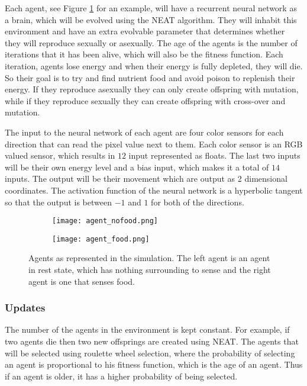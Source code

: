 Each agent, see Figure \ref{fig:agent} for an example, will have a recurrent neural network as a brain, which will be evolved using the NEAT algorithm.
They will inhabit this environment and have an extra evolvable parameter that determines whether they will reproduce sexually or asexually. 
The age of the agents is the number of iterations that it has been alive, which will also be the fitness function.
Each iteration, agents lose energy and when their energy is fully depleted, they will die.
So their goal is to try and find nutrient food and avoid poison to replenish their energy.
If they reproduce asexually they can only create offspring with mutation, while if they reproduce sexually they can create offspring with cross-over and mutation. 

The input to the neural network of each agent are four color sensors for each direction that can read the pixel value next to them.
Each color sensor is an RGB valued sensor, which results in $12$ input represented as floats.
The last two inputs will be their own energy level and a bias input, which makes it a total of $14$ inputs.
The output will be their movement which are output as 2 dimensional coordinates.
The activation function of the neural network is a hyperbolic tangent so that the output is between $-1$ and $1$ for both of the directions. 

\begin{figure}[H]
\begin{subfigure}[b]{0.5\linewidth}
    \centering
    \texttt{[image: agent\_nofood.png]}
\end{subfigure}%
\begin{subfigure}[b]{0.5\linewidth}
    \centering
    \texttt{[image: agent\_food.png]}
\end{subfigure}
\caption{Agents as represented in the simulation. The left agent is an agent in rest state, which has nothing surrounding to sense and the right agent is one that senses food.}
\label{fig:agent}
\end{figure}

\subsubsection{Updates}

The number of the agents in the environment is kept constant.
For example, if two agents die then two new offsprings are created using NEAT.
The agents that will be selected using roulette wheel selection, where the probability of selecting an agent is proportional to his fitness function, which is the age of an agent.
Thus if an agent is older, it has a higher probability of being selected.

